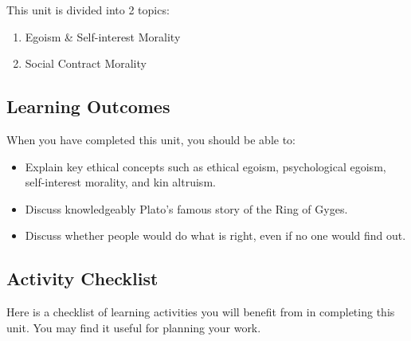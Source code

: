 \documentclass[
]{book}
\providecommand{\tightlist}{%
  \setlength{\itemsep}{0pt}\setlength{\parskip}{0pt}}
\begin{document}
This unit is divided into 2 topics:

\begin{enumerate}
\def\labelenumi{\arabic{enumi}.}
\tightlist
\item
  Egoism \& Self-interest Morality\\
\item
  Social Contract Morality
\end{enumerate}

\hypertarget{learning-outcomes-2}{%
\subsection*{Learning Outcomes}\label{learning-outcomes-2}}

When you have completed this unit, you should be able to:

\begin{itemize}
\tightlist
\item
  Explain key ethical concepts such as ethical egoism, psychological egoism, self-interest morality, and kin altruism.\\
\item
  Discuss knowledgeably Plato's famous story of the Ring of Gyges.\\
\item
  Discuss whether people would do what is right, even if no one would find out.
\end{itemize}

\hypertarget{activity-checklist-2}{%
\subsection*{Activity Checklist}\label{activity-checklist-2}}

Here is a checklist of learning activities you will benefit from in completing
this unit. You may find it useful for planning your work.
\end{document}
